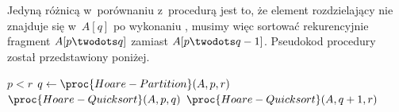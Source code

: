 \subproblem %
Jedyną różnicą w~porównaniu z~procedurą  jest to, że element rozdzielający nie znajduje się w~$A[q]$ po wykonaniu , musimy więc sortować rekurencyjnie fragment $A[p\twodots q]$ zamiast $A[p\twodots q-1]$.
Pseudokod procedury został przedstawiony poniżej.
\begin{codebox}
\li	\If $p<r$
\li		\Then $q\gets\proc{Hoare-Partition}(A,p,r)$
\li			$\proc{Hoare-Quicksort}(A,p,q)$
\li			$\proc{Hoare-Quicksort}(A,q+1,r)$
		\End
\end{codebox}
